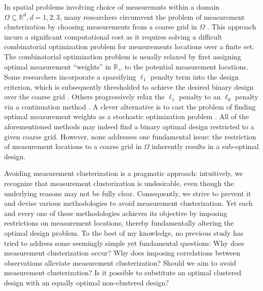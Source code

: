 In spatial problems involving choice of measuremnts within a domain
$\Omega \subseteq \mathbb{R}^d, d=1,2,3$, many researchers circumvent
the problem of measurement clusterization by choosing measurements
from a coarse grid in $\Omega$ \cite{koval2020, alexanderian2021,
  attia2020, alexanderian2014, alexanderian2016,
  alexanderian2018efficient}. This approach incurs a significant
computational cost as it requires solving a difficult combinatorial
optimization problem for measurements locations over a finite set. The
combinatorial optimization problem is usually relaxed by first
assigning optimal measurement ``weights'' in $\mathbb{R}_+$ to the
potential measurement locations. Some researchers incorporate a
sparsifying $\ell_1$ penalty term into the design criterion, which is
subsequently thresholded to achieve the desired binary design over the
coarse grid \cite{horesh2008borehole}. Others progressively relax the
$\ell_1$ penalty to an $\ell_0$ penalty via a continuation method
\cite{alexanderian2016, alexanderian2014}. A clever alternative is to
cast the problem of finding optimal measurement weights as a
stochastic optimization problem \cite{attia2022stochastic}. All of the
aforementioned methods may indeed find a binary optimal design
restricted to a given coarse grid. However, none addresses one
fundamental issue: the restriction of measurement locations to a
coarse grid in $\Omega$ inherently results in a sub-optimal design.

Avoiding measurement clusterization is a pragmatic approach:
intuitively, we recognize that measurement clusterization is
undesirable, even though the underlying reasons may not be fully
clear. Consequently, we strive to prevent it and devise various
methodologies to avoid measurement clusterization. Yet each and every
one of these methodologies achieves its objective by imposing
restrictions on measurement locations, thereby fundamentally altering
the optimal design problem. To the best of my knowledge, no previous
study has tried to address some seemingly simple yet fundamental
questions:
%
Why does measurement clusterization occur?
%
Why does imposing correlations between observations alleviate
measurement clusterization?
%
Should we aim to avoid measurement clusterization?
%
Is it possible to substitute an optimal clustered design with an
equally optimal non-clustered design?


